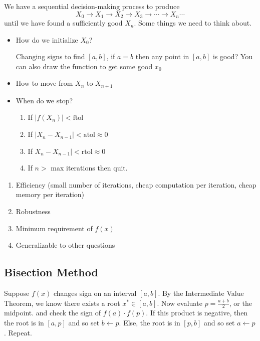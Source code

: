 \documentclass[12pt]{scrartcl}
\begin{document}
\begin{definition}
  We have a sequential decision-making process to produce
  \[X_0 \to X_1 \to X_2 \to X_3 \to \cdots \to X_n \cdots\]
  until we have found a sufficiently good $X_n$. Some things we need to think about. 
  \begin{itemize}
    \item How do we initialize $X_0$?
    
    Changing signs to find $[a,b]$, if $a=b$ then any point in $[a,b]$ is good?
    You can also draw the function to get some good $x_0$

    \item How to move from $X_n$ to $X_{n+1}$

      
    \item When do we stop?

    \begin{enumerate}
      \item If $|f(X_n)| < \text{ftol}$
      \item If $|X_n - X_{n-1}| < \text{atol} \approx 0$
      \item If $X_n - X_{n-1}| < \text{rtol} \approx 0$
      \item If $n > $ max iterations then quit.
    \end{enumerate}

  \end{itemize}
\end{definition}

\begin{note}

  \hfill

  \begin{enumerate}
    \item Efficiency (small number of iterations, cheap computation per iteration, cheap memory per iteration)
    \item Robustness
    \item Minimum requirement of $f(x)$
    \item Generalizable to other questions
  \end{enumerate}
  
\end{note}

\subsection{Bisection Method}

\begin{definition}
  Suppose $f(x)$ changes sign on an interval $[a,b]$. By the Intermediate Value Theorem, 
  we know there exists a root $x^* \in [a,b]$. Now evaluate $p = \frac{a+b}{2}$, or the midpoint.
  and check the sign of $f(a) \cdot f(p)$. If this product is negative, then the root is in $[a, p]$ and so set $b \leftarrow p$. Else, the 
  root is in $[p, b]$ and so set $a \leftarrow p$. Repeat. 
\end{definition}
\end{document}
